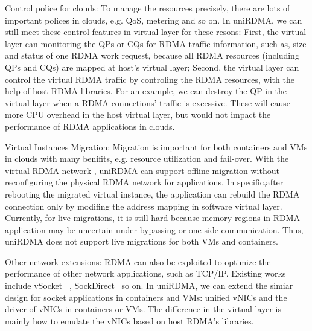 Control police for clouds: To manage the resources precisely, there are lots of important polices in clouds, e.g. QoS, metering and so on. In uniRDMA, we can still meet these control features in virtual layer for these resons:  First,  the virtual layer can monitoring the QPs or CQs for RDMA traffic information, such as,  size and status of one RDMA work request, because all RDMA resources (including QPs and CQs) are mapped at host's virtual layer; Second, the virtual layer can  control the virtual RDMA traffic by controling the RDMA resources,  with the help of host RDMA libraries. For an example,  we can destroy the QP in the virtual layer when a RDMA connections' traffic is excessive.  These will cause more CPU overhead in the host virtual layer, but would not impact the performance of RDMA applications in clouds.

Virtual Instances Migration: Migration is important  for both containers and VMs in clouds with many benifits, e.g. resource utilization and fail-over. With the virtual RDMA network , uniRDMA can support offline migration without reconfiguring the physical RDMA network for applications. In specific,after rebooting the migrated virtual instance, the application can rebuild the RDMA connection  only by modifing the address mapping in software virtual layer. Currently, for live migrations, it is still hard because memory regions in RDMA application may be uncertain under bypassing or one-side communication. Thus, uniRDMA does not support live migrations for both VMs and containers.

Other network extensions: RDMA can also be exploited to optimize the performance of other network applications,  such as TCP/IP.  Existing works include vSocket ~\cite{wang2019vsocket}, SockDirect~\cite{li2019socksdirect} so on. In uniRDMA, we can extend the simiar design for socket applications in containers and VMs: unified vNICs and the driver of vNICs in containers or VMs.  The difference in the virtual layer is mainly how to emulate the vNICs based on host RDMA's libraries. 